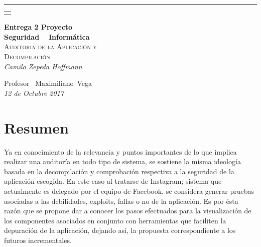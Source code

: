 \documentclass[a4paper,11pt]{article}
\theoremstyle{mytheor}
\begin{document}
\begin{titlepage} %
	
	\raggedleft %
	
	\rule{1pt}{\textheight} %
	\hspace{0.05\textwidth} %
	\parbox[b]{0.75\textwidth}{ %
	 \begin{tabularx}{\linewidth}{}
     \end{tabularx}
     \bigskip
     \vfill
		{\Huge\bfseries Entrega \textnumero{} 2 Proyecto\\[0.5\baselineskip] Seguridad ~ Informática}\\[2\baselineskip] %
		{\large\textsc{Auditoria de la Aplicación y}}\\
		{\large\textsc{Decompilación }}\\[1\baselineskip] %
		{\normalsize\textit{Camilo Zepeda Hoffmann}} %
		
		\vspace{0.5\textheight} %
		
		{\noindent Profesor~ Maximiliano~Vega\plogo}\\[\baselineskip] %
		{\normalsize\textit{12 de Octubre 2017}}
	}

\end{titlepage}


\section{Resumen}

Ya en conocimiento de la relevancia y puntos importantes de lo que implica realizar una auditoría en todo tipo de sistema, se sostiene la misma ideología basada en la decompilación y comprobación respectiva a la seguridad de la aplicación escogida. 
En este caso al tratarse de Instagram; sistema que actualmente es delegado por el equipo de Facebook, se considera generar pruebas asociadas a las debilidades, exploits, fallas o no de la aplicación. Es por ésta razón que se propone dar a conocer los pasos efectuados para la visualización de los componentes asociados en conjunto con herramientas que faciliten la depuración de la aplicación, dejando así, la propuesta correspondiente a los futuros incrementales.
\end{document}
